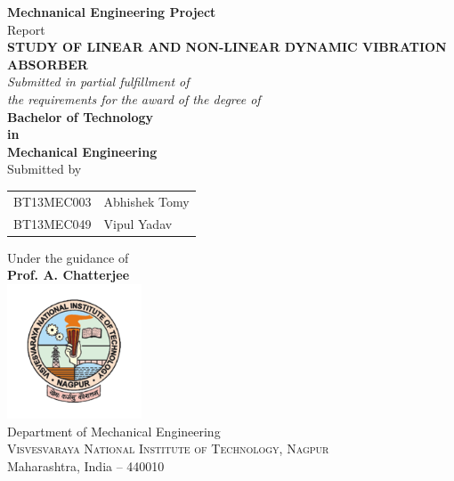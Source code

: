 %
%
%
\begin{titlepage}
\boxit
\begin{center}
\textup{ {\bf Mechnanical Engineering Project} \\ Report}\\[0.2in]
\huge \textbf {\color{red}\uppercase{STUDY OF Linear and Non-linear Dynamic Vibration \\Absorber}}\\
       \small \emph{Submitted in partial fulfillment of\\
       the requirements for the award of the degree of}\\[0.1in]

	{\bf \color{blue} Bachelor of Technology \\in\\ Mechanical Engineering}\\[0.2in]

\normalsize Submitted by \\
\begin{table}[h]
\centering
\begin{tabular}{ll} 
BT13MEC003 & Abhishek Tomy\\
BT13MEC049 & Vipul Yadav
 
\end{tabular}
\end{table}

Under the guidance of\\
{\textbf{Prof. A. Chatterjee}}\\[0.2in]

\includegraphics[width=0.3\textwidth]{"figures/vnitLogo"}\\[0.1in]
\Large{Department of Mechanical Engineering}\\
\normalsize
\textsc{Visvesvaraya National Institute of Technology, Nagpur}\\
Maharashtra, India -- 440010 \\
\end{center}

\end{titlepage}

